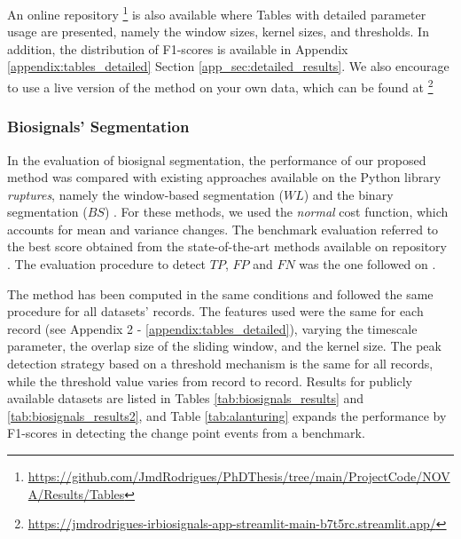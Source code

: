 An online repository \footnote{\url{https://github.com/JmdRodrigues/PhDThesis/tree/main/ProjectCode/NOVA/Results/Tables}} is also available where Tables with detailed parameter usage are presented, namely the window sizes, kernel sizes, and thresholds. In addition, the distribution of F1-scores is available in Appendix \ref{appendix:tables_detailed} Section \ref{app_sec:detailed_results}. We also encourage to use a live version of the method on your own data, which can be found at \footnote{\url{https://jmdrodrigues-irbiosignals-app-streamlit-main-b7t5rc.streamlit.app/}}

\subsubsection{Biosignals' Segmentation}

In the evaluation of biosignal segmentation, the performance of our proposed method was compared with existing approaches available on the Python library \textit{ruptures}, namely the window-based segmentation ($WL$) and the binary segmentation ($BS$) \cite{review_2}. For these methods, we used the \textit{normal} cost function, which accounts for mean and variance changes. The benchmark evaluation referred to the best score obtained from the state-of-the-art methods available on repository  \cite{cpd_alan}. The evaluation procedure to detect $TP$, $FP$ and $FN$ was the one followed on \cite{cpd_alan}.

The method has been computed in the same conditions and followed the same procedure for all datasets' records. The features used were the same for each record (see Appendix 2 - \ref{appendix:tables_detailed}), varying the timescale parameter, the overlap size of the sliding window, and the kernel size. The peak detection strategy based on a threshold mechanism is the same for all records, while the threshold value varies from record to record. Results for publicly available datasets are listed in Tables \ref{tab:biosignals_results} and \ref{tab:biosignals_results2}, and Table \ref{tab:alanturing} expands the performance by F1-scores in detecting the change point events from a benchmark.

